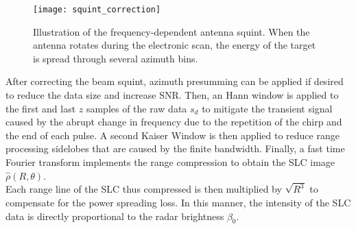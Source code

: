 \begin{figure}[ht]
	\centering
	\texttt{[image: squint\_correction]}
	\caption{Illustration of the frequency-dependent antenna squint. When the antenna rotates during the electronic scan, the energy of the target is spread through several azimuth bins.}
	\label{fig:squint_correction}
\end{figure}
After correcting the beam squint, azimuth presumming can be applied if desired to reduce the data size and increase SNR. Then, an Hann window is applied to the first and last $z$ samples of the raw data $s_{d}$ to mitigate the transient signal caused by the abrupt change in frequency due to the repetition of the chirp and the end of each pulse. A second Kaiser Window is then applied to reduce range processing sidelobes that are caused by the finite bandwidth. Finally, a fast time Fourier transform implements the range compression to obtain the SLC image $\hat{\rho}\left(R, \theta\right)$.\\ Each range line of the SLC thus compressed is then multiplied by $\sqrt{R^3}$ to compensate for the power spreading loss. In this manner, the intensity of the SLC data is directly proportional to the radar brightness $\beta_{0}$\cite{Raney1994}. 
